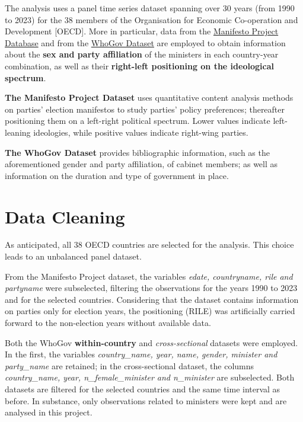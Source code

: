 \documentclass[12pt,letterpaper]{article}
\begin{document}
\vspace{0.5cm}
\noindent The analysis uses a panel time series dataset spanning over 30 years (from 1990 to 2023) for the 38 members of the Organisation for Economic Co-operation and Development [OECD]. More in particular, data from the \href{https://manifesto-project.wzb.eu/}{Manifesto Project Database} and from the \href{https://politicscentre.nuffield.ox.ac.uk/whogov-dataset/}{WhoGov Dataset} are employed to obtain information about the \textbf{sex and party affiliation} of the ministers in each country-year combination, as well as their \textbf{right-left positioning on the ideological spectrum}.

\noindent \textbf{The Manifesto Project Dataset} uses quantitative content analysis methods on parties' election manifestos to study parties' policy preferences; thereafter positioning them on a left-right political spectrum. Lower values indicate left-leaning ideologies, while positive values indicate right-wing parties.  

\noindent \textbf{The WhoGov Dataset} provides bibliographic information, such as the aforementioned gender and party affiliation, of cabinet members; as well as information on the duration and type of government in place. 

\section{Data Cleaning}
\noindent As anticipated, all 38 OECD countries are selected for the analysis. This choice leads to an unbalanced panel dataset. 
\vspace{0.5cm}



\vspace{0.5cm}
\noindent From the Manifesto Project dataset, the variables \emph{edate, countryname, rile and partyname} were subselected, filtering the observations for the years 1990 to 2023 and for the selected countries. Considering that the dataset contains information on parties only for election years, the positioning (RILE) was artificially carried forward to the non-election years without available data. 

\noindent Both the WhoGov \textbf{within-country} and \emph{cross-sectional} datasets were employed. In the first, the variables \emph{country\_name, year, name, gender, minister and party\_name} are retained; in the cross-sectional dataset, the columns \emph{country\_name, year, n\_female\_minister and n\_minister} are subselected. Both datasets are filtered for the selected countries and the same time interval as before. In substance, only observations related to ministers were kept and are analysed in this project. 
\end{document}

